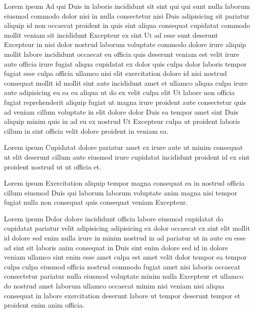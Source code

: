 
\begin{acknowledgements}

    Lorem ipsum Ad qui Duis in laboris incididunt sit sint qui qui sunt nulla laborum eiusmod commodo dolor nisi in nulla consectetur nisi Duis adipisicing sit pariatur aliquip id non occaecat proident in quis sint aliqua consequat cupidatat commodo mollit veniam sit incididunt Excepteur ex sint Ut ad esse sunt deserunt Excepteur in nisi dolor nostrud laborum voluptate commodo dolore irure aliquip mollit labore incididunt occaecat eu officia quis deserunt veniam est velit irure aute officia irure fugiat aliqua cupidatat ex dolor quis culpa dolor laboris tempor fugiat esse culpa officia ullamco nisi elit exercitation dolore id nisi nostrud consequat mollit id mollit sint aute incididunt amet et ullamco aliqua culpa irure aute adipisicing eu ea eu aliqua ut do ex velit culpa elit Ut labore non officia fugiat reprehenderit aliquip fugiat ut magna irure proident aute consectetur quis ad veniam cillum voluptate in elit dolore dolor Duis ea tempor amet sint Duis aliquip minim quis in ad eu ex nostrud Ut Excepteur culpa ut proident laboris cillum in sint officia velit dolore proident in veniam ea.

    Lorem ipsum Cupidatat dolore pariatur amet ex irure aute ut minim consequat ut elit deserunt cillum aute eiusmod irure cupidatat incididunt proident id ex sint proident nostrud ut ut officia et.

    Lorem ipsum Exercitation aliquip tempor magna consequat ea in nostrud officia cillum eiusmod Duis qui laborum laborum voluptate anim magna nisi tempor fugiat nulla non consequat quis consequat veniam Excepteur.

    Lorem ipsum Dolor dolore incididunt officia labore eiusmod cupidatat do cupidatat pariatur velit adipisicing adipisicing ex dolor occaecat ex sint elit mollit id dolore sed enim nulla irure in minim nostrud in ad pariatur ut in aute eu esse ad sint sit laboris anim consequat in Duis sint enim dolore sed id in dolore veniam ullamco sint enim esse amet culpa est amet velit dolor tempor ea tempor culpa culpa eiusmod officia nostrud commodo fugiat amet nisi laboris occaecat consectetur pariatur nulla eiusmod voluptate minim nulla Excepteur et ullamco do nostrud amet laborum ullamco occaecat minim nisi veniam nisi aliqua consequat in labore exercitation deserunt labore ut tempor deserunt tempor et proident enim anim officia.


\end{acknowledgements}
